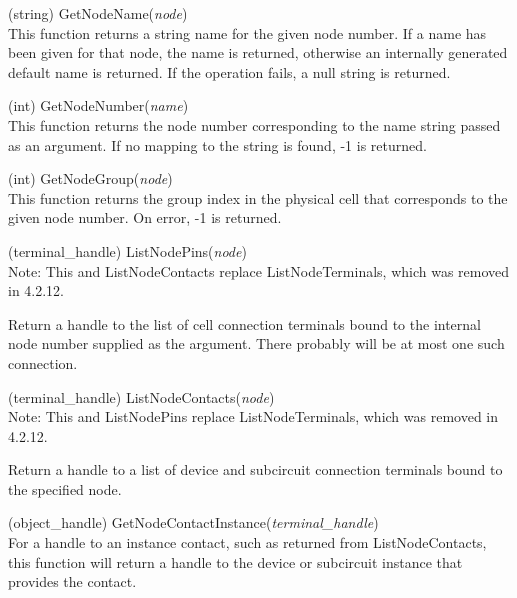 \begin{description}
\item{(string) \vt GetNodeName({\it node\/})}\\
This function returns a string name for the given node number.  If a
name has been given for that node, the name is returned, otherwise an
internally generated default name is returned.  If the operation
fails, a null string is returned.

\item{(int) \vt GetNodeNumber({\it name\/})}\\
This function returns the node number corresponding to the name string
passed as an argument.  If no mapping to the string is found, -1 is
returned.

\item{(int) \vt GetNodeGroup({\it node\/})}\\
This function returns the group index in the physical cell that
corresponds to the given node number.  On error, -1 is returned.

\item{(terminal\_handle) \vt ListNodePins({\it node\/})}\\
Note:  This and {\vt ListNodeContacts} replace {\vt
ListNodeTerminals}, which was removed in 4.2.12.

Return a handle to the list of cell connection terminals bound to the
internal node number supplied as the argument.  There probably will be
at most one such connection.

\item{(terminal\_handle) \vt ListNodeContacts({\it node\/})}\\
Note:  This and {\vt ListNodePins} replace {\vt ListNodeTerminals},
which was removed in 4.2.12.

Return a handle to a list of device and subcircuit connection
terminals bound to the specified node.

\item{(object\_handle) \vt GetNodeContactInstance({\it terminal\_handle\/})}\\
For a handle to an instance contact, such as returned from {\vt
ListNodeContacts}, this function will return a handle to the device or
subcircuit instance that provides the contact.


\end{description}
